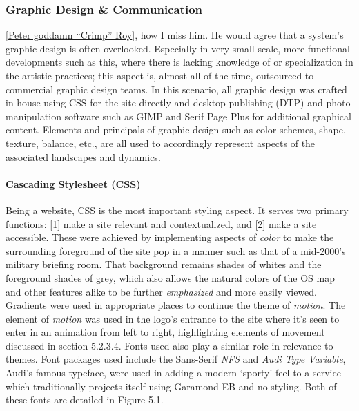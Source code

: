 \documentclass[11pt, english]{article}
\begin{document}
		\subsubsection{Graphic Design \& Communication}

	[\href{http://lewisbritton.com/Blog/Founding-Fathers.html}{Peter goddamn ``Crimp'' Roy}], how I miss him. He would agree that a system's graphic design is often overlooked. Especially in very small scale, more functional developments such as this, where there is lacking knowledge of or specialization in the artistic practices; this aspect is, almost all of the time, outsourced to commercial graphic design teams. In this scenario, all graphic design was crafted in-house using CSS for the site directly and desktop publishing (DTP) and photo manipulation software such as GIMP and Serif Page Plus for additional graphical content. Elements and principals of graphic design such as color schemes, shape, texture, balance, etc., are all used to accordingly represent aspects of the associated landscapes and dynamics.

			\paragraph{Cascading Stylesheet (CSS)}

	Being a website, CSS is the most important styling aspect. It serves two primary functions: [1] make a site relevant and contextualized, and [2] make a site accessible. These were achieved by implementing aspects of \textit{color} to make the surrounding foreground of the site pop in a manner such as that of a mid-2000's military briefing room. That background remains shades of whites and the foreground shades of grey, which also allows the natural colors of the OS map and other features alike to be further \textit{emphasized} and more easily viewed. Gradients were used in appropriate places to continue the theme of \textit{motion}. The element of \textit{motion} was used in the logo's entrance to the site where it's seen to enter in an animation from left to right, highlighting elements of movement discussed in section 5.2.3.4. Fonts used also play a similar role in relevance to themes. Font packages used include the Sans-Serif \textit{NFS} and \textit{Audi Type Variable}, Audi's famous typeface, were used in adding a modern `sporty' feel to a service which traditionally projects itself using Garamond EB and no styling. Both of these fonts are detailed in Figure 5.1.
\end{document}
